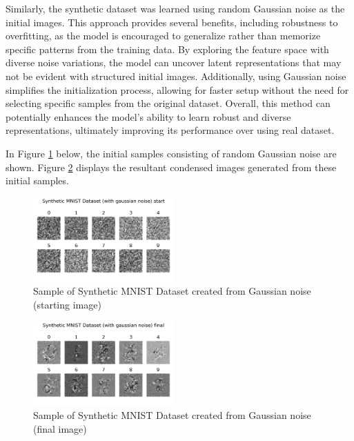 \documentclass[conference, compsoc]{IEEEtran}
\begin{document}
	Similarly, the synthetic dataset was learned using random Gaussian noise as the initial images. This approach provides several benefits, including robustness to overfitting, as the model is encouraged to generalize rather than memorize specific patterns from the training data. By exploring the feature space with diverse noise variations, the model can uncover latent representations that may not be evident with structured initial images. Additionally, using Gaussian noise simplifies the initialization process, allowing for faster setup without the need for selecting specific samples from the original dataset. Overall, this method can potentially enhances the model's ability to learn robust and diverse representations, ultimately improving its performance over using real dataset.
	
	In Figure \ref{fig:mnist_noise_sample} below, the initial samples consisting of random Gaussian noise are shown. Figure \ref{fig:mnist_noise_syn}	 displays the resultant condensed images generated from these initial samples.
	
	\begin{figure}[H]
		\centering
		\includegraphics[width=0.48\textwidth]{mnist_noise_sample.png}
		\caption{Sample of Synthetic MNIST Dataset created from Gaussian noise (starting image)}
		\label{fig:mnist_noise_sample}
	\end{figure}
	
	\begin{figure}[H]
		\centering
		\includegraphics[width=0.48\textwidth]{mnist_noise_syn.png}
		\caption{Sample of Synthetic MNIST Dataset created from Gaussian noise (final image)}
		\label{fig:mnist_noise_syn}
	\end{figure}
	
\end{document}
